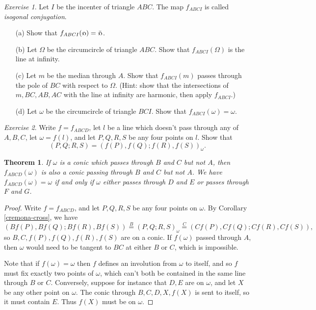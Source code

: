 \documentclass[letterpaper,11pt]{article}
\newtheorem{thm}{Theorem}
\theoremstyle{definition}
\theoremstyle{remark}
\newtheorem{exer}{Exercise}
\begin{document}
\begin{exer} Let $I$ be the incenter of triangle $ABC$. The map $f_{ABCI}$ is called \emph{isogonal conjugation}.
\begin{itemize}
\item[(a)] Show that $f_{ABCI}(\fish) = \bar\fish$.

\item[(b)] Let $\Omega$ be the circumcircle of triangle $ABC$. Show that $f_{ABCI}(\Omega)$ is the line at infinity.

\item[(c)] Let $m$ be the median through $A$. Show that $f_{ABCI}(m)$ passes through the pole of $BC$ with respect to $\Omega$. (Hint: show that the intersections of $m, BC, AB, AC$ with the line at infinity are harmonic, then apply $f_{ABCI}$.)

\item[(d)] Let $\omega$ be the circumcircle of triangle $BCI$. Show that $f_{ABCI}(\omega) = \omega$.
\end{itemize}
\end{exer}

\begin{exer}  Write $f = f_{ABCD}$, let $l$ be a line which doesn't pass through any of $A,B,C$, let $\omega = f(l)$, and let $P,Q,R,S$ be any four points on $l$. Show that
\[
(P,Q;R,S) = (f(P),f(Q);f(R),f(S))_\omega.
\]
\end{exer}

\begin{thm}\label{cremona-two} If $\omega$ is a conic which passes through $B$ and $C$ but not $A$, then $f_{ABCD}(\omega)$ is also a conic passing through $B$ and $C$ but not $A$. We have $f_{ABCD}(\omega) = \omega$ if and only if $\omega$ either passes through $D$ and $E$ or passes through $F$ and $G$.
\end{thm}
\begin{proof} Write $f = f_{ABCD}$, and let $P,Q,R,S$ be any four points on $\omega$. By Corollary \ref{cremona-cross}, we have
\[
(Bf(P),Bf(Q);Bf(R),Bf(S)) \stackrel{B}{=} (P,Q;R,S)_\omega \stackrel{C}{=} (Cf(P),Cf(Q);Cf(R),Cf(S)),
\]
so $B,C,f(P),f(Q),f(R),f(S)$ are on a conic. If $f(\omega)$ passed through $A$, then $\omega$ would need to be tangent to $BC$ at either $B$ or $C$, which is impossible.

Note that if $f(\omega) = \omega$ then $f$ defines an involution from $\omega$ to itself, and so $f$ must fix exactly two points of $\omega$, which can't both be contained in the same line through $B$ or $C$. Conversely, suppose for instance that $D,E$ are on $\omega$, and let $X$ be any other point on $\omega$. The conic through $B,C,D,X,f(X)$ is sent to itself, so it must contain $E$. Thus $f(X)$ must be on $\omega$.
\end{proof}
\end{document}
